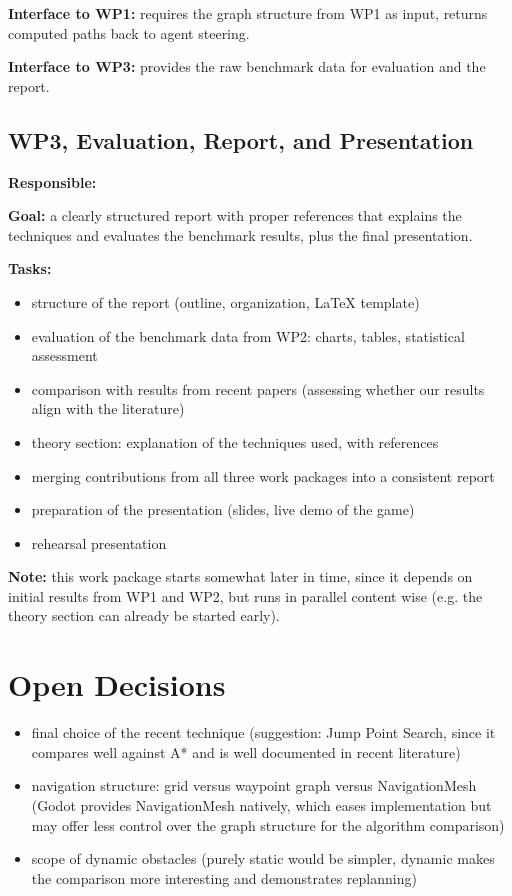 \documentclass[11pt,a4paper]{article}
\begin{document}
\textbf{Interface to WP1:} requires the graph structure from WP1 as input,
returns computed paths back to agent steering.

\textbf{Interface to WP3:} provides the raw benchmark data for evaluation
and the report.

\subsection*{WP3, Evaluation, Report, and Presentation}

\textbf{Responsible:} \underline{\hspace{4cm}}

\textbf{Goal:} a clearly structured report with proper references that
explains the techniques and evaluates the benchmark results, plus the
final presentation.

\textbf{Tasks:}
\begin{itemize}[leftmargin=1.2em]
  \item structure of the report (outline, organization, LaTeX template)
  \item evaluation of the benchmark data from WP2: charts, tables,
  statistical assessment
  \item comparison with results from recent papers (assessing whether our
  results align with the literature)
  \item theory section: explanation of the techniques used, with
  references
  \item merging contributions from all three work packages into a
  consistent report
  \item preparation of the presentation (slides, live demo of the game)
  \item rehearsal presentation
\end{itemize}

\textbf{Note:} this work package starts somewhat later in time, since it
depends on initial results from WP1 and WP2, but runs in parallel
content wise (e.g. the theory section can already be started early).



\section{Open Decisions}

\begin{itemize}[leftmargin=1.2em]
  \item final choice of the recent technique (suggestion: Jump Point
  Search, since it compares well against A* and is well documented in
  recent literature)
  \item navigation structure: grid versus waypoint graph versus
  NavigationMesh (Godot provides NavigationMesh natively, which eases
  implementation but may offer less control over the graph structure for
  the algorithm comparison)
  \item scope of dynamic obstacles (purely static would be simpler,
  dynamic makes the comparison more interesting and demonstrates
  replanning)
\end{itemize}
\end{document}
